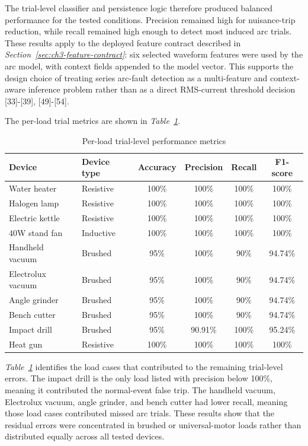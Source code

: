The trial-level classifier and persistence logic therefore produced balanced
performance for the tested conditions. Precision remained high for
nuisance-trip reduction, while recall remained high enough to detect most
induced arc trials. These results apply to the deployed feature contract
described in \textit{Section~\ref{sec:ch3-feature-contract}}: six selected
waveform features were used by the arc model, with context fields appended to
the model vector. This supports the design choice of treating series arc-fault
detection as a multi-feature and context-aware inference problem rather than as
a direct RMS-current threshold decision [33]-[39], [49]-[54].

The per-load trial metrics are shown in
\textit{Table~\ref{tab:ch4-per-load-metrics}}.

\begin{table}[H]
  \centering
  \caption{Per-load trial-level performance metrics}
  \label{tab:ch4-per-load-metrics}
  \small
  \setlength{\tabcolsep}{2.5pt}
  \begin{tabular}{p{}p{}cccc}
    \toprule
    \textbf{Device} & \textbf{Device type} & \textbf{Accuracy} & \textbf{Precision} & \textbf{Recall} & \textbf{F1-score} \\
    \midrule
    Water heater & Resistive & 100\% & 100\% & 100\% & 100\% \\
    Halogen lamp & Resistive & 100\% & 100\% & 100\% & 100\% \\
    Electric kettle & Resistive & 100\% & 100\% & 100\% & 100\% \\
    40W stand fan & Inductive & 100\% & 100\% & 100\% & 100\% \\
    Handheld vacuum & Brushed & 95\% & 100\% & 90\% & 94.74\% \\
    Electrolux vacuum & Brushed & 95\% & 100\% & 90\% & 94.74\% \\
    Angle grinder & Brushed & 95\% & 100\% & 90\% & 94.74\% \\
    Bench cutter & Brushed & 95\% & 100\% & 90\% & 94.74\% \\
    Impact drill & Brushed & 95\% & 90.91\% & 100\% & 95.24\% \\
    Heat gun & Resistive & 100\% & 100\% & 100\% & 100\% \\
    \bottomrule
  \end{tabular}
\end{table}

\textit{Table~\ref{tab:ch4-per-load-metrics}} identifies the load cases that
contributed to the remaining trial-level errors. The impact drill is the only
load listed with precision below 100\%, meaning it contributed the
normal-event false trip. The handheld vacuum, Electrolux vacuum, angle
grinder, and bench cutter had lower recall, meaning those load cases
contributed missed arc trials. These results show that the residual errors
were concentrated in brushed or universal-motor loads rather than distributed
equally across all tested devices.

